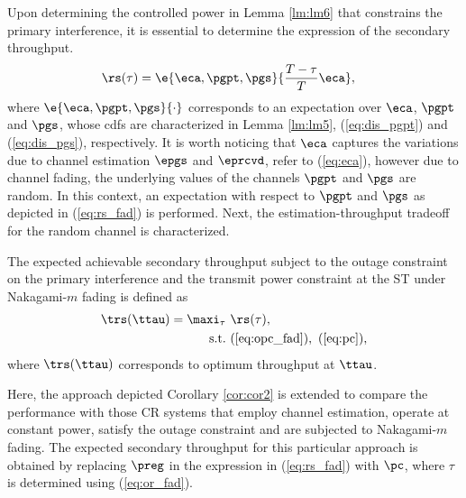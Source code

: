 {Upon determining the controlled power in Lemma \ref{lm:lm6} that constrains the primary interference, it is essential to determine the expression of the secondary throughput.
\begin{align}
\rs(\tau) &= \e{\eca, \pgpt, \pgs} {\frac{T - \tau}{T} \eca }, \label{eq:rs_fad} 
\end{align} 
where $\e{\eca, \pgpt, \pgs}{\cdot}$ corresponds to an expectation over $\eca$, $\pgpt$ and $\pgs$, whose cdfs are characterized in Lemma \ref{lm:lm5}, (\ref{eq:dis_pgpt}) and (\ref{eq:dis_pgs}), respectively. It is worth noticing that $\eca$ captures the variations due to channel estimation $\epgs$ and $\eprcvd$, refer to (\ref{eq:eca}), however due to channel fading, the underlying values of the channels $\pgpt$ and $\pgs$ are random. In this context, an expectation with respect to $\pgpt$ and $\pgs$ as depicted in (\ref{eq:rs_fad}) is performed.
Next, the estimation-throughput tradeoff for the random channel is characterized. 
\begin{theorem} \label{th:th2}
\normalfont
The expected achievable secondary throughput subject to the outage constraint on the primary interference and the transmit power constraint at the ST under Nakagami-$m$ fading is defined as
\begin{align}
\trs(\ttau) = \maxi_{\tau}  & \text{      } {\rs(\tau)}, 
 \label{eq:sys_fad} \\
\text{s.t.} & \text{ } (\ref{eq:opc_fad}), \text{  } (\ref{eq:pc}), \nonumber 
 \end{align}
where $\trs(\ttau)$ corresponds to optimum throughput at $\ttau$.  
\end{theorem}

\begin{coro} \label{cor:cor3}
\normalfont
Here, the approach depicted Corollary \ref{cor:cor2} is extended to compare the performance with those CR systems that employ channel estimation, operate at constant power, satisfy the outage constraint and are subjected to Nakagami-$m$ fading. The expected secondary throughput for this particular approach is obtained by replacing $\preg$ in the expression in (\ref{eq:rs_fad}) with $\pc$, where $\tau$ is determined using (\ref{eq:or_fad}). 

\end{coro}
 
}
